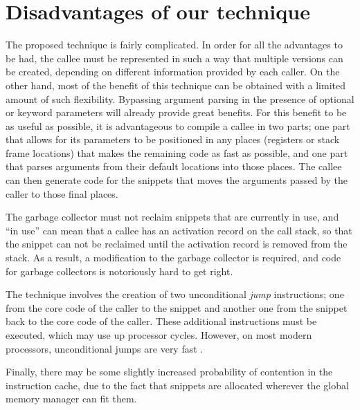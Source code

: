 \section{Disadvantages of our technique}

The proposed technique is fairly complicated.  In order for all the
advantages to be had, the callee must be represented in such a way
that multiple versions can be created, depending on different
information provided by each caller.  On the other hand, most of the
benefit of this technique can be obtained with a limited amount of
such flexibility.  Bypassing argument parsing in the presence of
optional or keyword parameters will already provide great benefits.
For this benefit to be as useful as possible, it is advantageous to
compile a callee in two parts; one part that allows for its parameters
to be positioned in any places (registers or stack frame locations)
that makes the remaining code as fast as possible, and one part that
parses arguments from their default locations into those places.  The
callee can then generate code for the snippets that moves the
arguments passed by the caller to those final places.

The garbage collector must not reclaim snippets that are currently in
use, and ``in use'' can mean that a callee has an activation record on
the call stack, so that the snippet can not be reclaimed until the
activation record is removed from the stack.  As a result, a
modification to the garbage collector is required, and code for
garbage collectors is notoriously hard to get right.

The technique involves the creation of two unconditional \emph{jump}
instructions; one from the core code of the caller to the snippet and
another one from the snippet back to the core code of the caller.
These additional instructions must be executed, which may use up
processor cycles.  However, on most modern processors, unconditional
jumps are very fast \cite{10.5555/3207796}.

Finally, there may be some slightly increased probability of
contention in the instruction cache, due to the fact that snippets are
allocated wherever the global memory manager can fit them.

